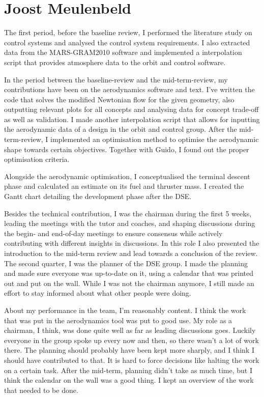\section{Joost Meulenbeld}


The first period, before the baseline review, I performed the literature study on control systems and analysed the control system requirements. I also extracted data from the MARS-GRAM2010 software and implemented a interpolation script that provides atmosphere data to the orbit and control software.

In the period between the baseline-review and the mid-term-review, my contributions have been on the aerodynamics software and text. I've written the code that solves the modified Newtonian flow for the given geometry, also outputting relevant plots for all concepts and analysing data for concept trade-off as well as validation. I made another interpolation script that allows for inputting the aerodynamic data of a design in the orbit and control group. After the mid-term-review, I implemented an optimisation method to optimise the aerodynamic shape towards certain objectives. Together with Guido, I found out the proper optimisation criteria.

Alongside the aerodynamic optimisation, I conceptualised the terminal descent phase and calculated an estimate on its fuel and thruster mass. I created the Gantt chart detailing the development phase after the DSE.

Besides the technical contribution, I was the chairman during the first 5 weeks, leading the meetings with the tutor and coaches, and shaping discussions during the begin- and end-of-day meetings to ensure consensus while actively contributing with different insights in discussions. In this role I also presented the introduction to the mid-term review and lead towards a conclusion of the review. The second quarter, I was the planner of the DSE group. I made the planning and made sure everyone was up-to-date on it, using a calendar that was printed out and put on the wall. While I was not the chairman anymore, I still made an effort to stay informed about what other people were doing.

About my performance in the team, I'm reasonably content. I think the work that was put in the aerodynamics tool was put to good use. My role as a chairman, I think, was done quite well as far as leading discussions goes. Luckily everyone in the group spoke up every now and then, so there wasn't a lot of work there. The planning should probably have been kept more sharply, and I think I should have contributed to that. It is hard to force decisions like halting the work on a certain task. After the mid-term, planning didn't take as much time, but I think the calendar on the wall was a good thing. I kept an overview of the work that needed to be done.

